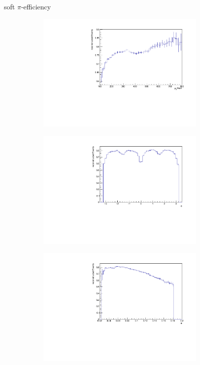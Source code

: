 \documentclass[11pt]{beamer}
\begin{document}
\begin{frame}{soft $\pi$-efficiency}
\begin{figure}
\begin{subfigure}{0.45\textwidth}
\includegraphics[width=0.9\textwidth]{up_pdf/tot/h_pt_reco_SPi.pdf}
\end{subfigure}
\begin{subfigure}{0.45\textwidth}
\includegraphics[width=0.9\textwidth]{up_pdf/tot/h_phi_reco_SPi.pdf}
\end{subfigure}
\begin{subfigure}{0.45\textwidth}
\includegraphics[width=0.9\textwidth]{up_pdf/tot/h_theta_reco_SPi.pdf}

\end{subfigure}
\end{figure}
\end{frame}
\end{document}
